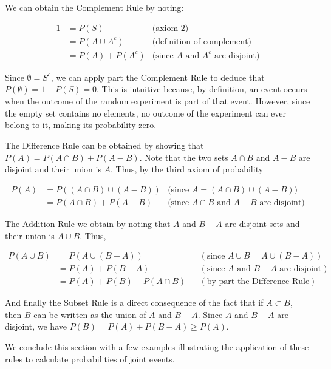 We can obtain the Complement Rule by noting:

\begin{align*}
    1 &= P(S) & \text{(axiom 2)} \\
      &= P(A \cup A^c) & \text{(definition of complement)} \\
      &= P(A) + P(A^c) & \text{(since } A \text{ and } A^c \text{ are disjoint)}
\end{align*}

Since $\emptyset=S^c$, we can apply part the Complement Rule to deduce that $P(\emptyset)=1-P(S)=0$. This is intuitive because, by definition, an event occurs when the outcome of the random experiment is part of that event. However, since the empty set contains no elements, no outcome of the experiment can ever belong to it, making its probability zero.

The Difference Rule can be obtained by showing that $P(A)=P(A \cap B)+P(A-B)$. Note that the two sets $A \cap B$ and $A-B$ are disjoint and their union is $A$. Thus, by the third axiom of probability

\begin{align*}
    P(A) &= P\left((A \cap B) \cup (A - B)\right) & \text{(since } A = (A \cap B) \cup (A - B)) \\
         &= P(A \cap B) + P(A - B) & \text{(since } A \cap B \text{ and } A - B \text{ are disjoint)}
    \end{align*}
    

The Addition Rule we obtain by noting that $A$ and $B-A$ are disjoint sets and their union is $A \cup B$. Thus,

\begin{align*}
    P(A \cup B) &= P(A \cup (B - A)) && (\text{since } A \cup B = A \cup (B - A)) \\
                &= P(A) + P(B - A) && (\text{since } A \text{ and } B - A \text{ are disjoint}) \\
                &= P(A) + P(B) - P(A \cap B) && (\text{by part the Difference Rule})
    \end{align*}
    
And finally the Subset Rule is a direct consequence of the fact that if $A \subset B$, then $B$ can be written as the union of $A$ and $B-A$. Since $A$ and $B-A$ are disjoint, we have $P(B)=P(A)+P(B-A) \geq P(A)$.

We conclude this section with a few examples illustrating the application of these rules to calculate probabilities of joint events.


